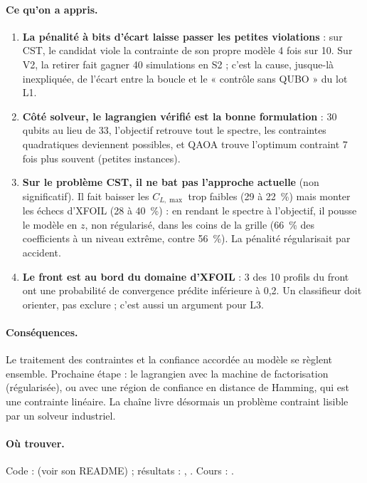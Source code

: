 \documentclass[11pt,a4paper]{report}
\begin{document}
\paragraph{Ce qu'on a appris.}
\begin{enumerate}
\item \textbf{La pénalité à bits d'écart laisse passer les petites violations} : sur CST, le candidat viole la contrainte de son propre modèle 4 fois sur 10. Sur V2, la retirer fait gagner 40 simulations en S2 ; c'est la cause, jusque-là inexpliquée, de l'écart entre la boucle et le « contrôle sans QUBO » du lot L1.
\item \textbf{Côté solveur, le lagrangien vérifié est la bonne formulation} : 30 qubits au lieu de 33, l'objectif retrouve tout le spectre, les contraintes quadratiques deviennent possibles, et QAOA trouve l'optimum contraint 7 fois plus souvent (petites instances).
\item \textbf{Sur le problème CST, il ne bat pas l'approche actuelle} (non significatif). Il fait baisser les $C_{L,\max}$ trop faibles (29 à 22~\%) mais monter les échecs d'XFOIL (28 à 40~\%) : en rendant le spectre à l'objectif, il pousse le modèle en $z$, non régularisé, dans les coins de la grille (66~\% des coefficients à un niveau extrême, contre 56~\%). La pénalité régularisait par accident.
\item \textbf{Le front est au bord du domaine d'XFOIL} : 3 des 10 profils du front ont une probabilité de convergence prédite inférieure à 0,2. Un classifieur doit orienter, pas exclure ; c'est aussi un argument pour L3.
\end{enumerate}

\paragraph{Conséquences.} Le traitement des contraintes et la confiance accordée au modèle se règlent ensemble. Prochaine étape : le lagrangien avec la machine de factorisation (régularisée), ou avec une région de confiance en distance de Hamming, qui est une contrainte linéaire. La chaîne livre désormais un problème contraint lisible par un solveur industriel.

\paragraph{Où trouver.} Code :  (voir son README) ; résultats : , . Cours : .
\end{document}
